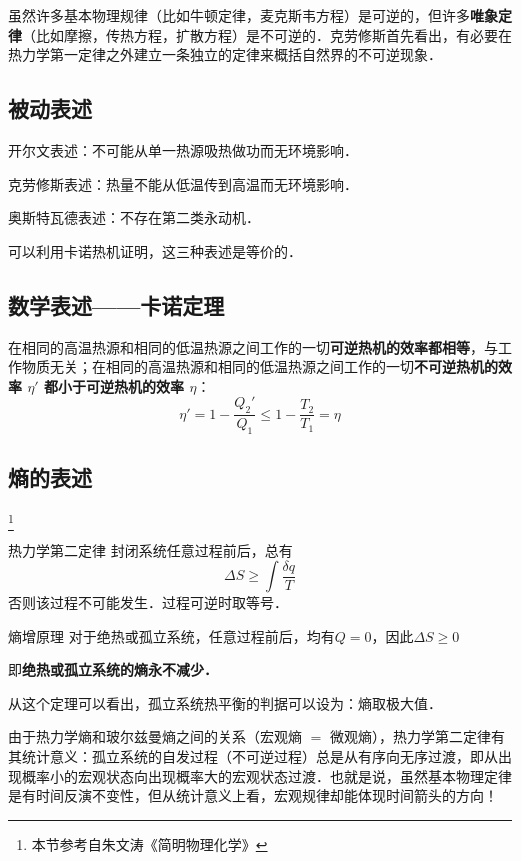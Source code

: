 
\begin{issues}
\issueDraft
\end{issues}


虽然许多基本物理规律（比如牛顿定律，麦克斯韦方程）是可逆的，但许多\textbf{唯象定律}（比如摩擦，传热方程，扩散方程）是不可逆的．克劳修斯首先看出，有必要在热力学第一定律之外建立一条独立的定律来概括自然界的不可逆现象．

\subsection{被动表述}
开尔文表述：不可能从单一热源吸热做功而无环境影响．

克劳修斯表述：热量不能从低温传到高温而无环境影响．

奥斯特瓦德表述：不存在第二类永动机．

可以利用卡诺热机证明，这三种表述是等价的．

\subsection{数学表述——卡诺定理}

在相同的高温热源和相同的低温热源之间工作的一切\textbf{可逆热机的效率都相等}，与工作物质无关；在相同的高温热源和相同的低温热源之间工作的一切\textbf{不可逆热机的效率 $\eta'$ 都小于可逆热机的效率 $\eta$}：
\begin{equation}
\eta'=1-\frac{Q_2'}{Q_1}\le 1-\frac{T_2}{T_1}=\eta
\end{equation}

\subsection{熵的表述}
\footnote{本节参考自朱文涛《简明物理化学》}

\begin{theorem}{热力学第二定律}
封闭系统任意过程前后，总有
\begin{equation}
\Delta S \ge \int \frac{\delta q}{T}
\end{equation}
否则该过程不可能发生．过程可逆时取等号．
\end{theorem}

\begin{corollary}{熵增原理}
对于绝热或孤立系统，任意过程前后，均有$Q=0$，因此$\Delta S \ge 0$

即\textbf{绝热或孤立系统的熵永不减少．}
\end{corollary}

从这个定理可以看出，孤立系统热平衡的判据可以设为：熵取极大值．

由于热力学熵和玻尔兹曼熵之间的关系（宏观熵 $=$ 微观熵），热力学第二定律有其统计意义：孤立系统的自发过程（不可逆过程）总是从有序向无序过渡，即从出现概率小的宏观状态向出现概率大的宏观状态过渡．也就是说，虽然基本物理定律是有时间反演不变性，但从统计意义上看，宏观规律却能体现时间箭头的方向！
